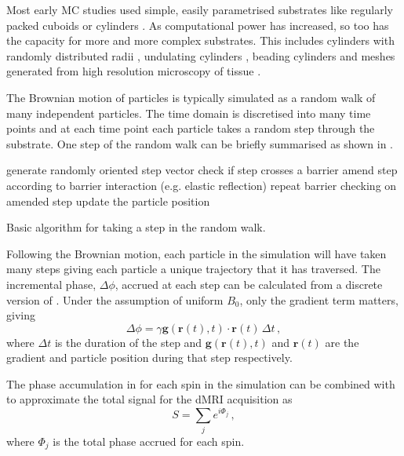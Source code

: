 Most early \ac{MC} studies used simple, easily parametrised substrates like regularly packed cuboids \cite{Szafer1995} or cylinders \cite{Ford1997}.
As computational power has increased, so too has the capacity for more and more complex substrates.
This includes cylinders with randomly distributed radii \cite{Hall2009}, undulating  cylinders \cite{Nilsson2012}, beading cylinders \cite{Budde2010} and meshes generated from high resolution microscopy of tissue \cite{Panagiotaki2010}.

The Brownian motion of particles is typically simulated as a random walk of many independent particles. The time domain is discretised into many time points and at each time point each particle takes a random step through the substrate.  
One step of the random walk can be briefly summarised as shown in .
\begin{algorithm}
  \begin{algorithmic}
    \State generate randomly oriented step vector
    \State check if step crosses a barrier 
    \State amend step according to barrier interaction (e.g. elastic reflection)
    \State repeat barrier checking on amended step
    \EndWhile
    \State update the particle position 
  \end{algorithmic}
  \caption{Basic algorithm for taking a step in the random walk.}
  \label{alg:MC_random_walk}
\end{algorithm}
 
Following the Brownian motion, each particle in the simulation will have taken many steps giving each particle a unique trajectory that it has traversed.
The incremental phase, $\Delta \phi$, accrued at each step can be calculated from a discrete version of . Under the assumption of uniform $B_0$, only the gradient term matters, giving
\begin{equation}
  \Delta \phi = \gamma \mathbf{g}(\mathbf{r}(t), t) \cdot \mathbf{r}(t)\, \Delta t \,,
  \label{eq:deltaPhi}
\end{equation}
where $\Delta t$ is the duration of the step and $\mathbf{g}(\mathbf{r}(t), t)$ and $\mathbf{r}(t)$ are the gradient and particle position during that step respectively.

The phase accumulation in  for each spin in the simulation can be combined with  to approximate the total signal for the \ac{dMRI} acquisition as
\begin{equation}
  S = \sum_j e^{i\Phi_j}\,,
  \label{eq:MCsignal}
\end{equation}
where $\Phi_j$ is the total phase accrued for each spin. 

